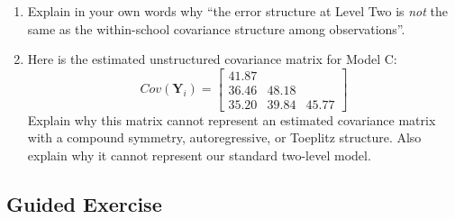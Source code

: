 \documentclass[
]{krantz}
\begin{document}
\begin{enumerate}
\item
  Explain in your own words why ``the error structure at Level Two is \emph{not} the same as the within-school covariance structure among observations''.
\item
  Here is the estimated unstructured covariance matrix for Model C:
  \[ Cov(\mathbf{Y}_i) =  \left[
        \begin{array}{cccc}
          41.87 & &   \\
          36.46 & 48.18 &  \\
          35.20 & 39.84 & 45.77
        \end{array} \right] \]
  Explain why this matrix cannot represent an estimated covariance matrix with a compound symmetry, autoregressive, or Toeplitz structure. Also explain why it cannot represent our standard two-level model.
\end{enumerate}

\hypertarget{guided-exercise-2}{%
\subsection{Guided Exercise}\label{guided-exercise-2}}
\end{document}
